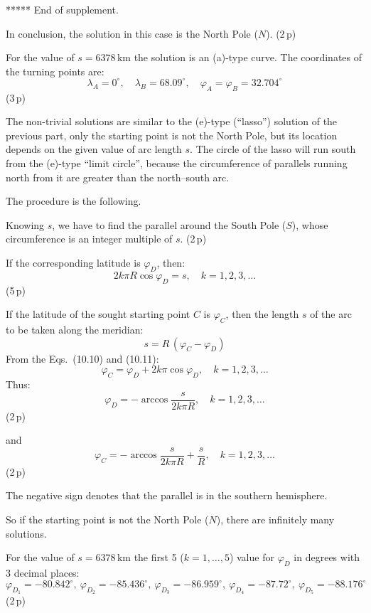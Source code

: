 \begin{description}

  ***** End of supplement.

  In conclusion, the solution in this case is the North Pole ($N$).
  \hfill(2\,p)

  For the value of $s = 6378$\,km the solution is an (a)-type curve. The
  coordinates of the turning points are:
  \[
    \lambda_A = 0^\circ, \quad \lambda_B = 68.09^\circ, \quad
    \varphi_A = \varphi_B = 32.704^\circ
  \]
  \hfill(3\,p)

\item[2.] The non-trivial solutions are similar to the (e)-type (``lasso'')
  solution of the previous part, only the starting point is not the North Pole,
  but its location depends on the given value of arc length $s$. The circle of
  the lasso will run south from the (e)-type ``limit circle'', because the
  circumference of parallels running north from it are greater than the
  north--south arc.

  The procedure is the following.

  Knowing $s$, we have to find the parallel around the South Pole ($S$), whose
  circumference is an integer multiple of $s$. \hfill(2\,p)

  If the corresponding latitude is $\varphi_D$, then:
  \[
    2k\pi R\cos\varphi_D = s, \quad k = 1, 2, 3, \ldots \tag{10.10}
  \]
  \hfill(5\,p)

  If the latitude of the sought starting point $C$ is $\varphi_C$, then the
  length $s$ of the arc to be taken along the meridian:
  \[
    s = R\,(\varphi_C - \varphi_D) \tag{10.11}
  \]
  From the Eqs.~(10.10) and (10.11):
  \[
    \varphi_C = \varphi_D + 2k\pi\cos\varphi_D, \quad k = 1, 2, 3, \ldots
    \tag{10.12}
  \]
  Thus:
  \[
    \varphi_D = -\arccos\frac{s}{2k\pi R}, \quad k = 1, 2, 3, \ldots
    \tag{10.13}
  \]
  \hfill(2\,p)

  and
  \[
    \varphi_C = -\arccos\frac{s}{2k\pi R} + \frac{s}{R},
    \quad k = 1, 2, 3, \ldots \tag{10.14}
  \]
  \hfill(2\,p)

  The negative sign denotes that the parallel is in the southern hemisphere.

  So if the starting point is not the North Pole ($N$), there are infinitely
  many solutions.

  For the value of $s = 6378$\,km the first 5 ($k = 1, \ldots, 5$) value for
  $\varphi_D$ in degrees with 3 decimal places:
  \[
    \varphi_{D_1} = -80.842^\circ,\ \varphi_{D_2} = -85.436^\circ,\
    \varphi_{D_3} = -86.959^\circ,\ \varphi_{D_4} = -87.72^\circ,\
    \varphi_{D_5} = -88.176^\circ
  \]
  \hfill(2\,p)


\end{description}
